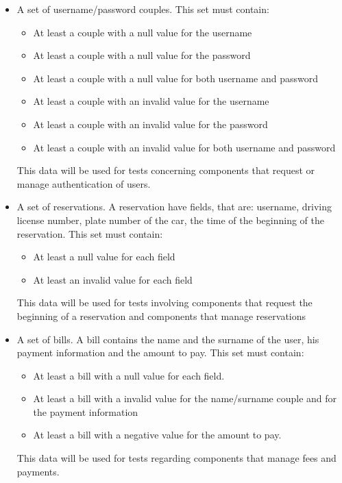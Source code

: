 \begin{itemize}
\item A set of username/password couples. This set must contain:
	\begin{itemize}[label={-}]
	\item At least a couple with a null value for the username
	\item At least a couple with a null value for the password
	\item At least a couple with a null value for both username and password
	\item At least a couple with an invalid value for the username
	\item At least a couple with an invalid value for the password
	\item At least a couple with an invalid value for both username and password
	\end{itemize}
This data will be used for tests concerning components that request or manage authentication of users.
\item A set of reservations. A reservation have fields, that are: username, driving license number, plate number of the car, the time of the beginning of the reservation.
This set must contain:
	\begin{itemize}[label={-}]
	\item At least a null value for each field
	\item At least an invalid value for each field
	\end{itemize}
This data will be used for tests involving components that request the beginning of a reservation and components that manage reservations
\item A set of bills. A bill contains the name and the surname of the user, his payment information and the amount to pay. This set must contain:
	\begin{itemize}[label={-}]
	\item At least a bill with a null value for each field.
	\item At least a bill with a invalid value for the name/surname couple and for the payment information
	\item At least a bill with a negative value for the amount to pay.
	\end{itemize}
This data will be used for tests regarding components that manage fees and payments.
\end{itemize}